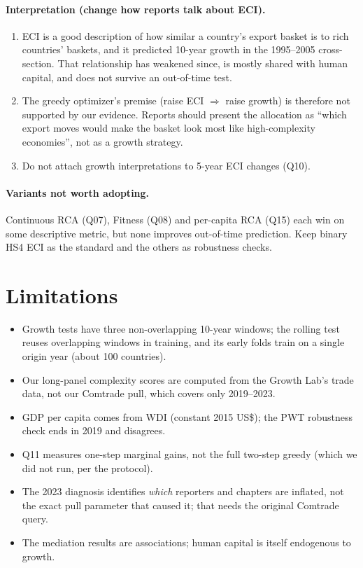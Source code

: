 \documentclass[11pt]{article}
\begin{document}
\paragraph{Interpretation (change how reports talk about ECI).}
\begin{enumerate}
\item ECI is a good description of how similar a country's export basket is to rich countries' baskets, and it predicted 10-year growth in the 1995--2005 cross-section. That relationship has weakened since, is mostly shared with human capital, and does not survive an out-of-time test.
\item The greedy optimizer's premise (raise ECI $\Rightarrow$ raise growth) is therefore not supported by our evidence. Reports should present the allocation as ``which export moves would make the basket look most like high-complexity economies'', not as a growth strategy.
\item Do not attach growth interpretations to 5-year ECI changes (Q10).
\end{enumerate}

\paragraph{Variants not worth adopting.} Continuous RCA (Q07), Fitness (Q08) and per-capita RCA (Q15) each win on some descriptive metric, but none improves out-of-time prediction. Keep binary HS4 ECI as the standard and the others as robustness checks.

\section{Limitations}
\begin{itemize}
\item Growth tests have three non-overlapping 10-year windows; the rolling test reuses overlapping windows in training, and its early folds train on a single origin year (about 100 countries).
\item Our long-panel complexity scores are computed from the Growth Lab's trade data, not our Comtrade pull, which covers only 2019--2023.
\item GDP per capita comes from WDI (constant 2015 US\$); the PWT robustness check ends in 2019 and disagrees.
\item Q11 measures one-step marginal gains, not the full two-step greedy (which we did not run, per the protocol).
\item The 2023 diagnosis identifies \emph{which} reporters and chapters are inflated, not the exact pull parameter that caused it; that needs the original Comtrade query.
\item The mediation results are associations; human capital is itself endogenous to growth.
\end{itemize}
\end{document}
